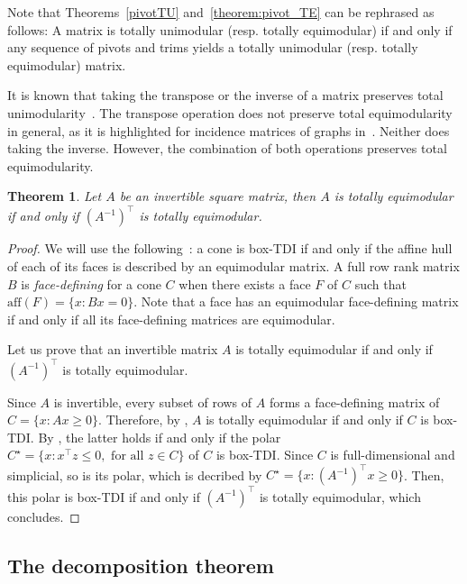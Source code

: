 \documentclass[11pt,a4paper]{amsart}
\renewcommand*{\geq}{\geqslant}
\renewcommand*{\leq}{\leqslant}
\theoremstyle{plain}
\newtheorem{theorem}{Theorem}[section]%
\theoremstyle{definition}
\begin{document}
Note that Theorems~\ref{pivotTU} and~\ref{theorem:pivot_TE} can be rephrased as follows: A matrix is totally unimodular (resp. totally equimodular) if and only if any sequence of pivots and trims yields a totally unimodular (resp. totally equimodular) matrix. 

\medskip

It is known that taking the transpose or the inverse of a matrix preserves total unimodularity~\cite[Page~280]{Schrijver_1999}.
The transpose operation does not preserve total equimodularity in general, as it is highlighted for incidence matrices of graphs in~\cite{Chervet_Grappe_Lacroix_Pisanu_Wolfler-Calvo_2023}.
Neither does taking the inverse.
However, the combination of both operations preserves total equimodularity.

\begin{theorem}\label{theorem:invert_TE}
	Let $A$ be an invertible square matrix, then $A$ is totally equimodular if and only if $(A^{-1})^\top$ is totally equimodular.
\end{theorem}
\begin{proof}
	We will use the following~\cite[Theorem~2]{Chervet_Grappe_Robert_2021}: a cone is box-TDI if and only if the affine hull of each of its faces is described by an equimodular matrix.
	A full row rank matrix $B$ is {\em face-defining} for a cone $C$ when there exists a face $F$ of $C$ such that $\textrm{aff}(F)=\{x:Bx = 0\}$.
	Note that a face has an equimodular face-defining matrix if and only if all its face-defining matrices are equimodular.
	
	Let us prove that an invertible matrix $A$ is totally equimodular if and only if $(A^{-1})^\top$ is totally equimodular.
	
	Since $A$ is invertible, every subset of rows of $A$ forms a face-defining matrix of $C = \{x: Ax\geq 0\}$.
	Therefore, by \cite[{Theorem~2}]{Chervet_Grappe_Robert_2021}, $A$ is totally equimodular if and only if $C$ is box-TDI. 
	By \cite[Lemma~6]{Chervet_Grappe_Robert_2021}, the latter holds if and only if the polar $C^\star=\{x:x^\top z\leq 0, \text{ for all $z \in C$}\}$ of $C$ is box-TDI.
	Since $C$ is full-dimensional and simplicial, so is its polar, which is decribed by $C^\star=\{x: (A^{-1})^\top x \geq 0\}$.
	Then, this polar is box-TDI if and only if $(A^{-1})^\top$ is totally equimodular, which concludes.
	\end{proof}


\subsection{The decomposition theorem}\label{subsection:decomposition}
\end{document}

